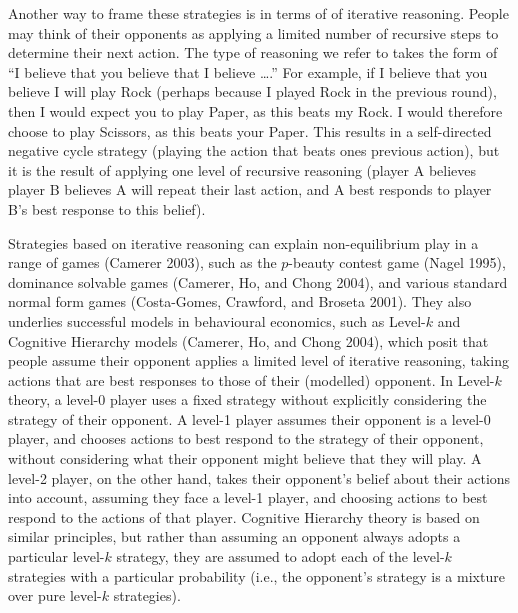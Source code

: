 \documentclass[smallextended]{svjour3}       %
\begin{document}
Another way to frame these strategies is in terms of of iterative
reasoning. People may think of their opponents as applying a limited
number of recursive steps to determine their next action. The type of
reasoning we refer to takes the form of ``I believe that you believe
that I believe \ldots{}.'' For example, if I believe that you believe I
will play Rock (perhaps because I played Rock in the previous round),
then I would expect you to play Paper, as this beats my Rock. I would
therefore choose to play Scissors, as this beats your Paper. This
results in a self-directed negative cycle strategy (playing the action
that beats ones previous action), but it is the result of applying one
level of recursive reasoning (player A believes player B believes A will
repeat their last action, and A best responds to player B's best
response to this belief).

Strategies based on iterative reasoning can explain non-equilibrium play
in a range of games (Camerer 2003), such as the \(p\)-beauty contest
game (Nagel 1995), dominance solvable games (Camerer, Ho, and Chong
2004), and various standard normal form games (Costa-Gomes, Crawford,
and Broseta 2001). They also underlies successful models in behavioural
economics, such as Level-\(k\) and Cognitive Hierarchy models (Camerer,
Ho, and Chong 2004), which posit that people assume their opponent
applies a limited level of iterative reasoning, taking actions that are
best responses to those of their (modelled) opponent. In Level-\(k\)
theory, a level-0 player uses a fixed strategy without explicitly
considering the strategy of their opponent. A level-1 player assumes
their opponent is a level-0 player, and chooses actions to best respond
to the strategy of their opponent, without considering what their
opponent might believe that they will play. A level-2 player, on the
other hand, takes their opponent's belief about their actions into
account, assuming they face a level-1 player, and choosing actions to
best respond to the actions of that player. Cognitive Hierarchy theory
is based on similar principles, but rather than assuming an opponent
always adopts a particular level-\(k\) strategy, they are assumed to
adopt each of the level-\(k\) strategies with a particular probability
(i.e., the opponent's strategy is a mixture over pure level-\(k\)
strategies).
\end{document}
